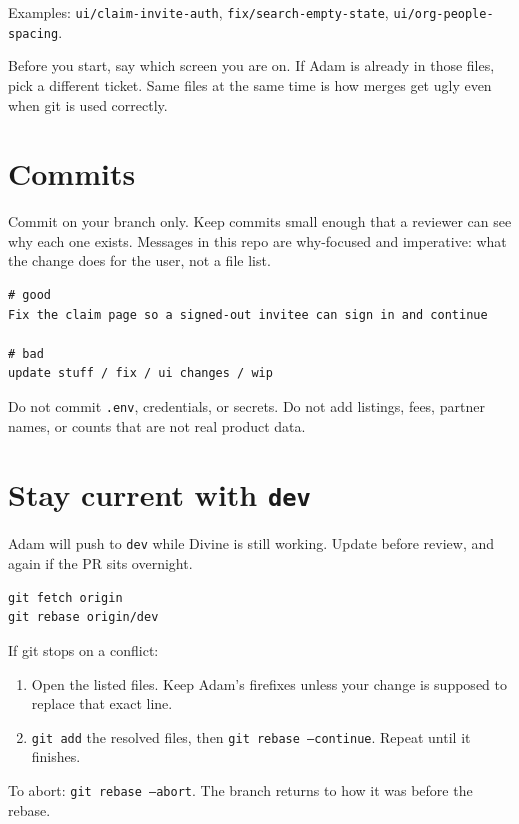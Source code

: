 \documentclass[11pt]{article}
\begin{document}
Examples: \texttt{ui/claim-invite-auth}, \texttt{fix/search-empty-state}, \texttt{ui/org-people-spacing}.

Before you start, say which screen you are on. If Adam is already in those files, pick a different ticket. Same files at the same time is how merges get ugly even when git is used correctly.

\section{Commits}

Commit on your branch only. Keep commits small enough that a reviewer can see why each one exists. Messages in this repo are why-focused and imperative: what the change does for the user, not a file list.

\begin{Verbatim}[fontsize=\small,frame=single,framesep=5pt]
# good
Fix the claim page so a signed-out invitee can sign in and continue

# bad
update stuff / fix / ui changes / wip
\end{Verbatim}

Do not commit \texttt{.env}, credentials, or secrets. Do not add listings, fees, partner names, or counts that are not real product data.

\section{Stay current with \texttt{dev}}

Adam will push to \texttt{dev} while Divine is still working. Update before review, and again if the PR sits overnight.

\begin{Verbatim}[fontsize=\small,frame=single,framesep=5pt]
git fetch origin
git rebase origin/dev
\end{Verbatim}

If git stops on a conflict:

\begin{enumerate}
  \item Open the listed files. Keep Adam's firefixes unless your change is supposed to replace that exact line.
  \item \texttt{git add} the resolved files, then \texttt{git rebase --continue}. Repeat until it finishes.
\end{enumerate}

To abort: \texttt{git rebase --abort}. The branch returns to how it was before the rebase.
\end{document}
